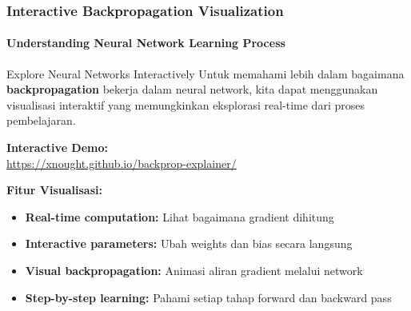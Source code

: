 \documentclass[t,aspectratio=169,xcolor=dvipsnames]{beamer}
\begin{document}
\begin{frame}
    \frametitle{Interactive Backpropagation Visualization}
    \framesubtitle{Understanding Neural Network Learning Process}

    \begin{exampleblock}{Explore Neural Networks Interactively}
        Untuk memahami lebih dalam bagaimana \textbf{backpropagation} bekerja dalam neural network, kita dapat menggunakan visualisasi interaktif yang memungkinkan eksplorasi real-time dari proses pembelajaran.
    \end{exampleblock}

    \begin{center}
        \large
        \textbf{Interactive Demo:}\\[0.5cm]
        \textcolor{blue}{\url{https://xnought.github.io/backprop-explainer/}}
    \end{center}

    \textbf{Fitur Visualisasi:}
    \begin{itemize}
        \item \textbf{Real-time computation:} Lihat bagaimana gradient dihitung
        \item \textbf{Interactive parameters:} Ubah weights dan bias secara langsung
        \item \textbf{Visual backpropagation:} Animasi aliran gradient melalui network
        \item \textbf{Step-by-step learning:} Pahami setiap tahap forward dan backward pass
    \end{itemize}

\end{frame}
\end{document}
